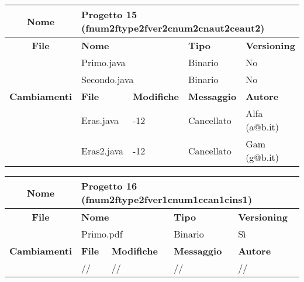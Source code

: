 \begin{table}[ht]
\footnotesize
\begin{tabular}{|c|p{2.5cm}|p{2cm}|p{2.5cm}|p{2.5cm}|}
  \hline
  \textbf{Nome}	& \multicolumn{4}{l|}{Progetto 15 (fnum2ftype2fver2cnum2cnaut2ceaut2)} 									\\
  \hline
  \rowcolor{lightgray}\textbf{File} 		& \multicolumn{2}{l|}{\textbf{Nome}}		& \textbf{Tipo}		& \textbf{Versioning} 		\\
						\cline{2-5}
						& \multicolumn{2}{l|}{Primo.java}		& Binario		& No				\\
						\cline{2-5}
						& \multicolumn{2}{l|}{Secondo.java}		& Binario		& No				\\
  \hline
  \rowcolor{lightgray}\textbf{Cambiamenti}	& \textbf{File}		&\textbf{Modifiche}	& \textbf{Messaggio}	& \textbf{Autore}		\\
						\cline{2-5}
						& Eras.java		& -12	  		& Cancellato		& Alfa (a@b.it)			\\
						\cline{2-5}
						& Eras2.java		& -12	  		& Cancellato		& Gam (g@b.it)			\\
  \hline
\end{tabular}
\end{table}






\begin{table}[ht]
\footnotesize
\begin{tabular}{|c|p{2.5cm}|p{2cm}|p{2.5cm}|p{2.5cm}|}
  \hline
  \textbf{Nome}	& \multicolumn{4}{l|}{Progetto 16 (fnum2ftype2fver1cnum1ccan1cins1)} 									\\
  \hline
  \rowcolor{lightgray}\textbf{File} 		& \multicolumn{2}{l|}{\textbf{Nome}}		& \textbf{Tipo}		& \textbf{Versioning} 		\\
						\cline{2-5}
						& \multicolumn{2}{l|}{Primo.pdf}		& Binario		& Sì				\\
  \hline
  \rowcolor{lightgray}\textbf{Cambiamenti}	& \textbf{File}		&\textbf{Modifiche}	& \textbf{Messaggio}	& \textbf{Autore}		\\
						\cline{2-5}
						& //			& //	 		& //			& //				\\
						
  \hline
\end{tabular}
\end{table}

